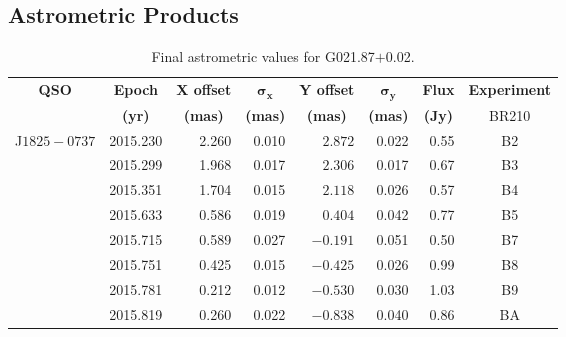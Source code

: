     \clearpage
    \subsection{Astrometric Products}   
	\begin{table}[h]
    	\onehalfspacing
		\footnotesize
		\centering
		\caption{Final astrometric values for G021.87$+$0.02.}
		\label{tab:g021_position}
		\begin{tabular}{lrrrrrrc} \toprule
			\multicolumn{1}{c}{\bf QSO}&\multicolumn{1}{c}{\bf Epoch} & \multicolumn{1}{c}{\bf X offset} & \multicolumn{1}{c}{$\boldsymbol{\sigma_x}$} & \multicolumn{1}{c}{\bf Y offset} & \multicolumn{1}{c}{$\boldsymbol{\sigma_y}$} & \multicolumn{1}{c}{\bf Flux} & \multicolumn{1}{c}{\bf Experiment} \\
			\multicolumn{1}{c}{}&\multicolumn{1}{c}{\bf (yr)} & \multicolumn{1}{c}{\bf (mas)} & \multicolumn{1}{c}{\bf (mas)} & \multicolumn{1}{c}{\bf (mas)} & \multicolumn{1}{c}{\bf (mas)} & \multicolumn{1}{c}{\bf (Jy)} & \multicolumn{1}{c}{BR210} \\ \midrule   
			J$1825-0737$
						&2015.230  &  2.260 &  0.010   &  $ 2.872$  &  0.022 & 0.55 & B2 \\
						&2015.299  &  1.968 &  0.017   &  $ 2.306$  &  0.017 & 0.67 & B3 \\
						&2015.351  &  1.704 &  0.015   &  $ 2.118$  &  0.026 & 0.57 & B4 \\
						&2015.633  &  0.586 &  0.019   &  $ 0.404$  &  0.042 & 0.77 & B5 \\
						&2015.715  &  0.589 &  0.027   &  $-0.191$  &  0.051 & 0.50 & B7 \\
						&2015.751  &  0.425 &  0.015   &  $-0.425$  &  0.026 & 0.99 & B8 \\
						&2015.781  &  0.212 &  0.012   &  $-0.530$  &  0.030 & 1.03 & B9 \\
						&2015.819  &  0.260 &  0.022   &  $-0.838$  &  0.040 & 0.86 & BA \\
			\bottomrule
		\end{tabular}
	\end{table} 
	
